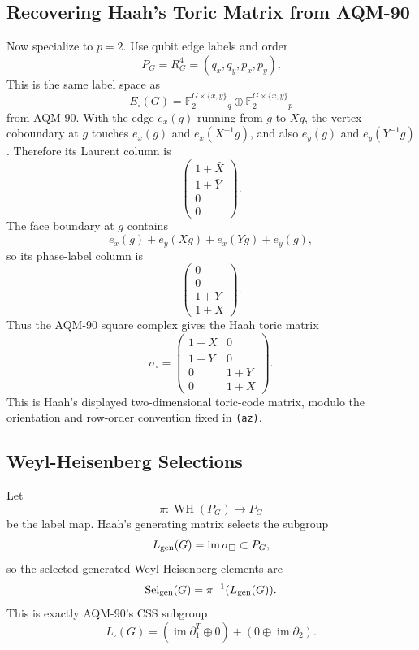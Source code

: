 \subsection{Recovering Haah's Toric Matrix from AQM-90}

Now specialize to \(p=2\).  Use qubit edge labels and order
\[
  P_G=R_G^4=(q_x,q_y,p_x,p_y).
\]
This is the same label space as
\[
  E_\square(G)=
  \mathbb F_2^{G\times\{x,y\}}{}_q
  \oplus
  \mathbb F_2^{G\times\{x,y\}}{}_p
\]
from AQM-90.  With the edge \(e_x(g)\) running from \(g\) to \(Xg\), the
vertex coboundary at \(g\) touches \(e_x(g)\) and \(e_x(X^{-1}g)\), and also
\(e_y(g)\) and \(e_y(Y^{-1}g)\).  Therefore its Laurent column is
\[
  \begin{pmatrix}
  1+\bar X\\
  1+\bar Y\\
  0\\
  0
  \end{pmatrix}.
\]
The face boundary at \(g\) contains
\[
  e_x(g)+e_y(Xg)+e_x(Yg)+e_y(g),
\]
so its phase-label column is
\[
  \begin{pmatrix}
  0\\
  0\\
  1+Y\\
  1+X
  \end{pmatrix}.
\]
Thus the AQM-90 square complex gives the Haah toric matrix
\[
  \sigma_\square=
  \begin{pmatrix}
  1+\bar X & 0\\
  1+\bar Y & 0\\
  \hline
  0 & 1+Y\\
  0 & 1+X
  \end{pmatrix}.
\]
This is Haah's displayed two-dimensional toric-code matrix, modulo the
orientation and row-order convention fixed in \texttt{(az)}.

\subsection{Weyl-Heisenberg Selections}

Let
\[
  \pi:\operatorname{WH}(P_G)\to P_G
\]
be the label map.  Haah's generating matrix selects the subgroup
\[
  L_{\rm gen}(G)=\operatorname{im}\sigma_\square\subset P_G,
\]
so the selected generated Weyl-Heisenberg elements are
\[
  \operatorname{Sel}_{\rm gen}(G)=\pi^{-1}(L_{\rm gen}(G)).
\]
This is exactly AQM-90's CSS subgroup
\[
  L_\square(G)=
  (\operatorname{im}\partial_1^T\oplus0)
  +(0\oplus\operatorname{im}\partial_2).
\]

